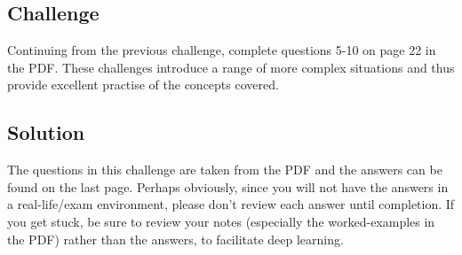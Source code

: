 \subsection*{Challenge}
Continuing from the previous challenge, complete questions 5-10 on page 22 in the PDF. These challenges introduce a range of more complex situations and thus provide excellent practise of the concepts covered.

%

\subsection*{Solution}
The questions in this challenge are taken from the PDF and the answers can be found on the last page. Perhaps obviously, since you will not have the answers in a real-life/exam environment, please don't review each answer until completion. If you get stuck, be sure to review your notes (especially the worked-examples in the PDF) rather than the answers, to facilitate deep learning. 

\timebox

